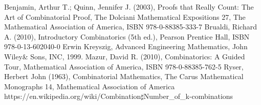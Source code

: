 \documentclass[12pt]{article}
\begin{document}
\begin{thebibliography}{10}
\bibitem{}
Benjamin, Arthur T.; Quinn, Jennifer J. (2003), Proofs that Really Count: The Art of Combinatorial Proof, The Dolciani Mathematical Expositions 27, The Mathematical Association of America, ISBN 978-0-88385-333-7
\bibitem{}
Brualdi, Richard A. (2010), Introductory Combinatorics (5th ed.), Pearson Prentice Hall, ISBN 978-0-13-602040-0
\bibitem{}
Erwin Kreyszig, Advanced Engineering Mathematics, John Wiley\& Sons, INC, 1999.
\bibitem{}
Mazur, David R. (2010), Combinatorics: A Guided Tour, Mathematical Association of America, ISBN 978-0-88385-762-5
\bibitem{}
Ryser, Herbert John (1963), Combinatorial Mathematics, The Carus Mathematical Monographs 14, Mathematical Association of America
\bibitem{}
https://en.wikipedia.org/wiki/Combination$\sharp$Number\_of\_k-combinations
\end{thebibliography}
\end{document}
